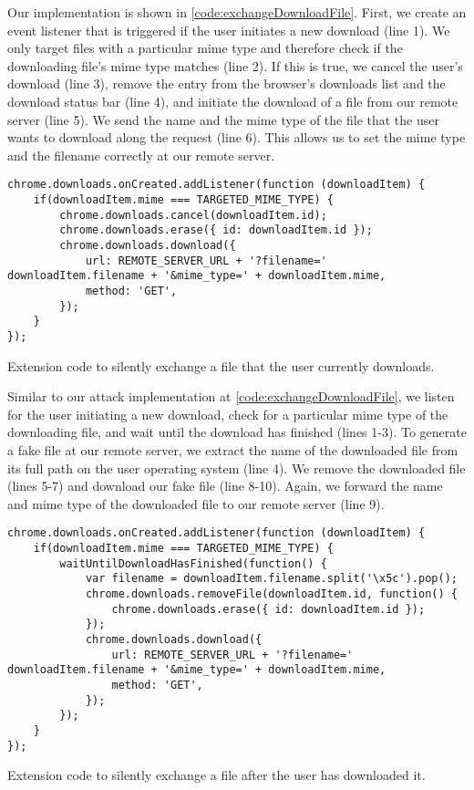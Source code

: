 	Our implementation is shown in \autoref{code:exchangeDownloadFile}. First, we create an event listener that is triggered if the user initiates a new download (line 1). We only target files with a particular mime type and therefore check if the downloading file's mime type matches (line 2). If this is true, we cancel the user's download (line 3), remove the entry from the browser's downloads list and the download status bar (line 4), and initiate the download of a file from our remote server (line 5). We send the name and the mime type of the file that the user wants to download along the request (line 6). This allows us to set the mime type and the filename correctly at our remote server.
	
	\begin{code}
		\begin{lstlisting}
chrome.downloads.onCreated.addListener(function (downloadItem) {
	if(downloadItem.mime === TARGETED_MIME_TYPE) {
		chrome.downloads.cancel(downloadItem.id);
		chrome.downloads.erase({ id: downloadItem.id });
		chrome.downloads.download({
			url: REMOTE_SERVER_URL + '?filename=' downloadItem.filename + '&mime_type=' + downloadItem.mime,
			method: 'GET',
		});
	}
});
\end{lstlisting}	
		\caption{Extension code to silently exchange a file that the user currently downloads.}	
		\label{code:exchangeDownloadFile}
	\end{code}
	
	Similar to our attack implementation at \autoref{code:exchangeDownloadFile}, we listen for the user initiating a new download, check for a particular mime type of the downloading file, and wait until the download has finished (lines 1-3). To generate a fake file at our remote server, we extract the name of the downloaded file from its full path on the user operating system (line 4). We remove the downloaded file (lines 5-7) and download our fake file (line 8-10). Again, we forward the name and mime type of the downloaded file to our remote server (line 9).
	
	\begin{code}
		\begin{lstlisting}
chrome.downloads.onCreated.addListener(function (downloadItem) {
	if(downloadItem.mime === TARGETED_MIME_TYPE) {
		waitUntilDownloadHasFinished(function() {
			var filename = downloadItem.filename.split('\x5c').pop();			
			chrome.downloads.removeFile(downloadItem.id, function() {
				chrome.downloads.erase({ id: downloadItem.id });
			});
			chrome.downloads.download({
				url: REMOTE_SERVER_URL + '?filename=' downloadItem.filename + '&mime_type=' + downloadItem.mime,
				method: 'GET',
			});	
		});
	}
});
\end{lstlisting}
		\caption{Extension code to silently exchange a file after the user has downloaded it.}
		\label{code:exchangeDownloadedFile}
	\end{code}



